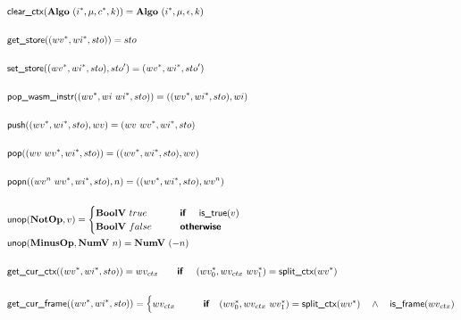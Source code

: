 \begin{align*}
  &\clearctx(\algo ~ (\seq i, \mu, \seq c, k)) = \algo ~ (\seq i, \mu, \epsilon, k) \\
%
\newline \\
  &\getstore((\seq{wv}, \seq{wi}, sto)) = sto \\
%
\newline \\
  &\setstore((\seq{wv}, \seq{wi}, sto), sto') = (\seq{wv}, \seq{wi}, sto') \\
%
\newline \\
  &\popwasminstr((\seq{wv}, wi ~ \seq{wi}, sto)) = ((\seq{wv}, \seq{wi}, sto), wi) \\
%
\newline \\
  &\push((\seq{wv}, \seq{wi}, sto), wv) = (wv ~ \seq{wv}, \seq{wi}, sto) \\
%
\newline \\
  &\pop((wv ~ \seq{wv}, \seq{wi}, sto)) = ((\seq{wv}, \seq{wi}, sto), wv) \\
%
\newline \\
  &\popn((wv^n ~ \seq{wv}, \seq{wi}, sto), n) = ((\seq{wv}, \seq{wi}, sto), wv^n) \\
%
\newline \\
  &\unop(\notop, v) =
    \begin{cases}
      \boolv ~ true &\quad\quad\premise{if}\quad ~ \istrue(v) \\
      \boolv ~ false &\quad\quad\premise{otherwise} \\
    \end{cases}
  \\
  &\unop(\minusop, \numv ~ n) = \numv ~ (-n) \\
%
\newline \\
  &\getcurctx((\seq{wv}, \seq{wi}, sto)) =
  wv_{ctx} \quad\quad\premise{if}\quad ~ (\seq{wv_0}, wv_{ctx} ~ \seq{wv_1}) = \splitctx(\seq{wv}) \\
%
\newline \\
  &\getcurframe((\seq{wv}, \seq{wi}, sto)) =
    \begin{cases}
      wv_{ctx} &\quad\quad\premise{if}\quad
      (\seq{wv_0}, wv_{ctx} ~ \seq{wv_1}) = \splitctx(\seq{wv}) \quad\land\quad \isframe(wv_{ctx})\\

\end{cases}
\end{align*}
